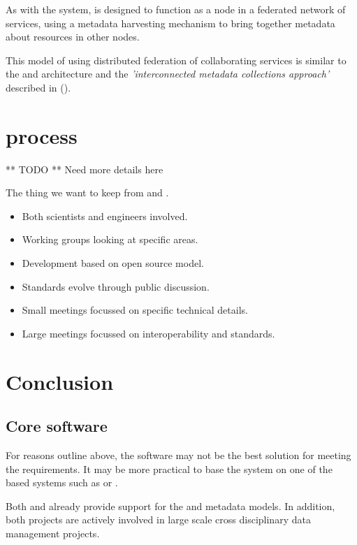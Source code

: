 \documentclass{article}
\begin{document}
As with the \cite{metacat} system, \cite{ckan} is designed to function
as a node in a federated network of services, using a metadata harvesting
mechanism to bring together metadata about resources in other nodes.

This model of using distributed federation of collaborating services
is similar to the \cite{ivoa} and \cite{astro} architecture and the
\textit{'interconnected metadata collections approach'} described in
 (\cite{jones-2006}).

\section{\cite{ivoa} process}


** TODO ** Need more details here


The thing we want to keep from \cite{ivoa} and \cite{astro}.

\begin{itemize}
    \item Both scientists and engineers involved.
    \item Working groups looking at specific areas.
    \item Development based on open source model.
    \item Standards evolve through public discussion.
    \item Small meetings focussed on specific technical details.
    \item Large meetings focussed on interoperability and standards.
\end{itemize}

\section{Conclusion}

\subsection{Core software}

For reasons outline above, the \cite{astro} software may not be the best
solution for meeting the \cite{trop} requirements.
It may be more practical to base the \cite{trop} system on one of the
\cite{gis} based systems such as \cite{metacat} or \cite{ckan}.

Both \cite{metacat} and \cite{ckan} already provide support for the \cite{gis}
and \cite{eml} metadata models. In addition, both projects are actively
involved in large scale cross disciplinary data management projects.
\end{document}
